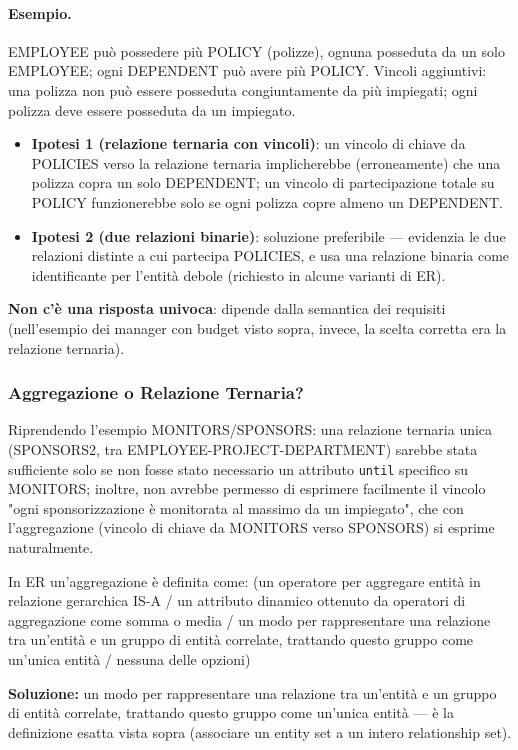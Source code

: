 \documentclass[12pt, a4paper]{article}
\begin{document}
\paragraph{Esempio.} EMPLOYEE può possedere più POLICY (polizze), ognuna posseduta da un solo EMPLOYEE; ogni DEPENDENT può avere più POLICY. Vincoli aggiuntivi: una polizza non può essere posseduta congiuntamente da più impiegati; ogni polizza deve essere posseduta da un impiegato.
\begin{itemize}
    \item \textbf{Ipotesi 1 (relazione ternaria con vincoli)}: un vincolo di chiave da POLICIES verso la relazione ternaria implicherebbe (erroneamente) che una polizza copra un solo DEPENDENT; un vincolo di partecipazione totale su POLICY funzionerebbe solo se ogni polizza copre almeno un DEPENDENT.
    \item \textbf{Ipotesi 2 (due relazioni binarie)}: soluzione preferibile — evidenzia le due relazioni distinte a cui partecipa POLICIES, e usa una relazione binaria come identificante per l'entità debole (richiesto in alcune varianti di ER).
\end{itemize}
\textbf{Non c'è una risposta univoca}: dipende dalla semantica dei requisiti (nell'esempio dei manager con budget visto sopra, invece, la scelta corretta era la relazione ternaria).

\subsubsection{Aggregazione o Relazione Ternaria?}
Riprendendo l'esempio MONITORS/SPONSORS: una relazione ternaria unica (SPONSORS2, tra EMPLOYEE-PROJECT-DEPARTMENT) sarebbe stata sufficiente solo se non fosse stato necessario un attributo \texttt{until} specifico su MONITORS; inoltre, non avrebbe permesso di esprimere facilmente il vincolo "ogni sponsorizzazione è monitorata al massimo da un impiegato", che con l'aggregazione (vincolo di chiave da MONITORS verso SPONSORS) si esprime naturalmente.

\begin{tcolorbox}[colback=lightergray!10, colframe=tocsec, title=\textbf{Esercizio 1}]
In ER un'aggregazione è definita come: (un operatore per aggregare entità in relazione gerarchica IS-A / un attributo dinamico ottenuto da operatori di aggregazione come somma o media / un modo per rappresentare una relazione tra un'entità e un gruppo di entità correlate, trattando questo gruppo come un'unica entità / nessuna delle opzioni)
\end{tcolorbox}
\textbf{Soluzione:} un modo per rappresentare una relazione tra un'entità e un gruppo di entità correlate, trattando questo gruppo come un'unica entità — è la definizione esatta vista sopra (associare un entity set a un intero relationship set).
\end{document}
